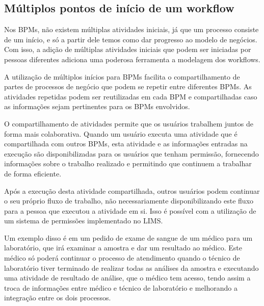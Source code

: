 \subsection{Múltiplos pontos de início de um workflow}




Nos BPMs, não existem múltiplas atividades iniciais, já que um processo consiste de um início, e só a partir dele temos como dar progresso ao modelo de negócios. Com isso, a adição de múltiplas atividades iniciais que podem ser iniciadas por pessoas diferentes adiciona uma poderosa ferramenta a modelagem dos workflows.


A utilização de múltiplos inícios para BPMs facilita o compartilhamento de partes de processos de negócio que podem se repetir entre diferentes BPMs. As atividades repetidas podem ser reutilizadas em cada BPM e compartilhadas caso as informações sejam pertinentes para os BPMs envolvidos.

O compartilhamento de atividades permite que os usuários trabalhem juntos de forma mais colaborativa. Quando um usuário executa uma atividade que é compartilhada com outros BPMs, esta atividade e as informações entradas na execução são disponibilizadas para os usuários que tenham permissão, fornecendo informações sobre o trabalho realizado e permitindo que continuem a trabalhar de forma eficiente.

Após a execução desta atividade compartilhada, outros usuários podem continuar o seu próprio fluxo de trabalho, não necessariamente disponibilizando este fluxo para a pessoa que executou a atividade em si. Isso é possível com a utilização de um sistema de permissões implementado no LIMS.

Um exemplo disso é em um pedido de exame de sangue de um médico para um laboratório, que irá examinar a amostra e dar um resultado ao médico. Este médico só poderá continuar o processo de atendimento quando o técnico de laboratório tiver terminado de realizar todas as análises da amostra e executando uma atividade de resultado de análise, que o médico tem acesso, tendo assim a troca de informações entre médico e técnico de laboratório e melhorando a integração entre os dois processos.


